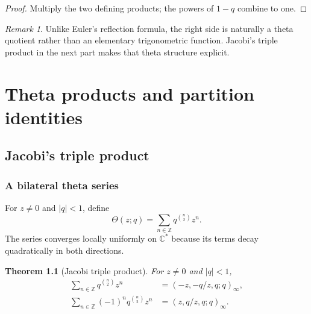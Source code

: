\documentclass[11pt,oneside,openany]{book}
\newtheorem{theorem}{Theorem}[chapter]
\theoremstyle{definition}
\theoremstyle{remark}
\newtheorem{remark}[theorem]{Remark}
\newcommand{\C}{\mathbb C}
\newcommand{\Z}{\mathbb Z}
\newcommand{\abs}[1]{\lvert #1\rvert}
\begin{document}
\begin{proof}
Multiply the two defining products; the powers of $1-q$ combine to one.
\end{proof}

\begin{remark}
Unlike Euler's reflection formula, the right side is naturally a theta quotient rather than an elementary trigonometric function.  Jacobi's triple product in the next part makes that theta structure explicit.
\end{remark}


\part{Theta products and partition identities}

\chapter{Jacobi's triple product}\label{chap:jtp}

\section{A bilateral theta series}

For $z\ne0$ and $\abs q<1$, define
\[
 \Theta(z;q)=\sum_{n\in\Z}q^{\binom n2}z^n.
\]
The series converges locally uniformly on $\C^*$ because its terms decay quadratically in both directions.

\begin{theorem}[Jacobi triple product]\label{thm:jtp}
For $z\ne0$ and $\abs q<1$,
\begin{align}
 \sum_{n\in\Z}q^{\binom n2}z^n
 &=(-z,-q/z,q;q)_\infty,\label{eq:jtp-plus}\\
 \sum_{n\in\Z}(-1)^nq^{\binom n2}z^n
 &=(z,q/z,q;q)_\infty.\label{eq:jtp-minus}
\end{align}
\end{theorem}
\end{document}
